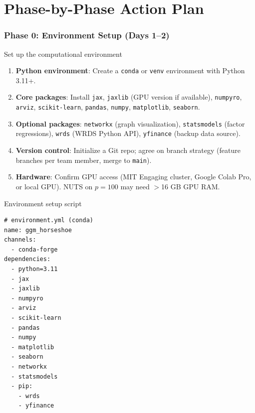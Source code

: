 \documentclass[11pt,a4paper]{article}
\begin{document}
\part{Phase-by-Phase Action Plan}

\section{Phase 0: Environment Setup (Days 1--2)}\label{sec:phase0}

\begin{action}{Set up the computational environment}
\begin{enumerate}
  \item \textbf{Python environment}: Create a \texttt{conda} or \texttt{venv} environment with Python 3.11+.
  \item \textbf{Core packages}: Install \texttt{jax}, \texttt{jaxlib} (GPU version if available), \texttt{numpyro}, \texttt{arviz}, \texttt{scikit-learn}, \texttt{pandas}, \texttt{numpy}, \texttt{matplotlib}, \texttt{seaborn}.
  \item \textbf{Optional packages}: \texttt{networkx} (graph visualization), \texttt{statsmodels} (factor regressions), \texttt{wrds} (WRDS Python API), \texttt{yfinance} (backup data source).
  \item \textbf{Version control}: Initialize a Git repo; agree on branch strategy (feature branches per team member, merge to \texttt{main}).
  \item \textbf{Hardware}: Confirm GPU access (MIT Engaging cluster, Google Colab Pro, or local GPU). NUTS on $p=100$ may need $>$16 GB GPU RAM.
\end{enumerate}
\end{action}

\begin{code}{Environment setup script}
\begin{lstlisting}
# environment.yml (conda)
name: ggm_horseshoe
channels:
  - conda-forge
dependencies:
  - python=3.11
  - jax
  - jaxlib
  - numpyro
  - arviz
  - scikit-learn
  - pandas
  - numpy
  - matplotlib
  - seaborn
  - networkx
  - statsmodels
  - pip:
    - wrds
    - yfinance
\end{lstlisting}
\end{code}
\end{document}
